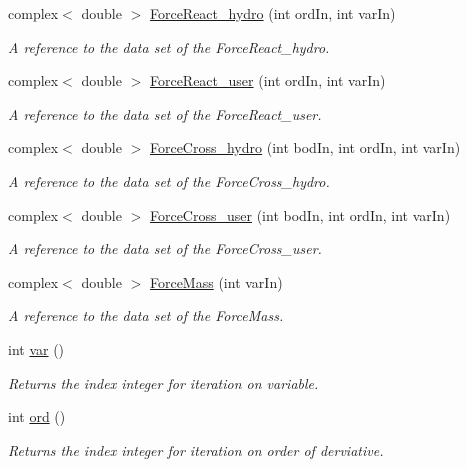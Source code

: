 \begin{DoxyCompactItemize}
complex$<$ double $>$ \hyperlink{class_equationof_motion_a2295d1980a94d2e0ba3bc893850030b2}{Force\-React\-\_\-hydro} (int ord\-In, int var\-In)
\begin{DoxyCompactList}\small\item\em A reference to the data set of the Force\-React\-\_\-hydro. \end{DoxyCompactList}\item 
complex$<$ double $>$ \hyperlink{class_equationof_motion_a0a7bbf64f137a2a170a4a5795b09cc5d}{Force\-React\-\_\-user} (int ord\-In, int var\-In)
\begin{DoxyCompactList}\small\item\em A reference to the data set of the Force\-React\-\_\-user. \end{DoxyCompactList}\item 
complex$<$ double $>$ \hyperlink{class_equationof_motion_a69d0270703f14a1ddeb6b73120642943}{Force\-Cross\-\_\-hydro} (int bod\-In, int ord\-In, int var\-In)
\begin{DoxyCompactList}\small\item\em A reference to the data set of the Force\-Cross\-\_\-hydro. \end{DoxyCompactList}\item 
complex$<$ double $>$ \hyperlink{class_equationof_motion_a96bae9e3c360a4b9ddf3b41726a89736}{Force\-Cross\-\_\-user} (int bod\-In, int ord\-In, int var\-In)
\begin{DoxyCompactList}\small\item\em A reference to the data set of the Force\-Cross\-\_\-user. \end{DoxyCompactList}\item 
complex$<$ double $>$ \hyperlink{class_equationof_motion_a848b45b70d29d793b86a7c1ca8f97ed6}{Force\-Mass} (int var\-In)
\begin{DoxyCompactList}\small\item\em A reference to the data set of the Force\-Mass. \end{DoxyCompactList}\item 
int \hyperlink{class_equationof_motion_ab69511cc5037376cf7da80ce30d9eaab}{var} ()
\begin{DoxyCompactList}\small\item\em Returns the index integer for iteration on variable. \end{DoxyCompactList}\item 
int \hyperlink{class_equationof_motion_a31f904818ce75c9e2a2b5cff9fc707a5}{ord} ()
\begin{DoxyCompactList}\small\item\em Returns the index integer for iteration on order of derviative. \end{DoxyCompactList}\item 

\end{DoxyCompactItemize}
